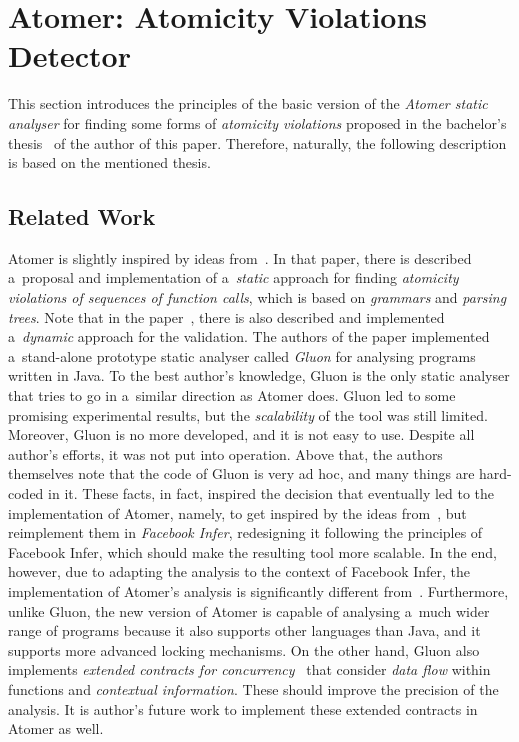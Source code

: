 \documentclass{ExcelAtFIT}
\theoremstyle{example}
\begin{document}
\section{\hspace{-.15em}Atomer: Atomicity Violations Detector}
\label{sec:atomer}

This section introduces the principles of the basic version of the \emph{Atomer static analyser} for finding some forms of \emph{atomicity violations} proposed in the bachelor's thesis~\cite{harmimBP} of the author of this paper. Therefore, naturally, the following description is based on the mentioned thesis.

\subsection{Related Work}

Atomer is slightly inspired by ideas from~\cite{contracts2017}. In that paper, there is described a~proposal and implementation of a~\emph{static} approach for finding \emph{atomicity violations of sequences of function calls}, which is based on \emph{grammars} and \emph{parsing trees}. Note that in the paper~\cite{contracts2017}, there is also described and implemented a~\emph{dynamic} approach for the validation. The authors of the paper implemented a~stand-alone prototype static analyser called \emph{Gluon} for analysing programs written in Java. To the best author's knowledge, Gluon is the only static analyser that tries to go in a~similar direction as Atomer does. Gluon led to some promising experimental results, but the \emph{scalability} of the tool was still limited. Moreover, Gluon is no more developed, and it is not easy to use. Despite all author's efforts, it was not put into operation. Above that, the authors themselves note that the code of Gluon is very ad hoc, and many things are hard-coded in it. These facts, in fact, inspired the decision that eventually led to the implementation of Atomer, namely, to get inspired by the ideas from~\cite{contracts2017}, but reimplement them in \emph{Facebook Infer}, redesigning it following the principles of Facebook Infer, which should make the resulting tool more scalable. In the end, however, due to adapting the analysis to the context of Facebook Infer, the implementation of Atomer's analysis is significantly different from~\cite{contracts2017}. Furthermore, unlike Gluon, the new version of Atomer is capable of analysing a~much wider range of programs because it also supports other languages than Java, and it supports more advanced locking mechanisms. On the other hand, Gluon also implements \emph{extended contracts for concurrency}~\cite{contracts2017} that consider \emph{data flow} within functions and \emph{contextual information}. These should improve the precision of the analysis. It is author's future work to implement these extended contracts in Atomer as well.
\end{document}
